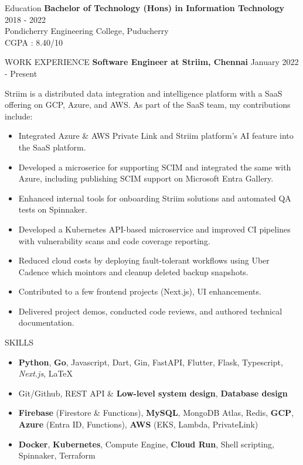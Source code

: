 \documentclass{template}
\begin{document}
\begin{rSection}{Education}
{\bf Bachelor of Technology (Hons) in Information Technology} \hfill {2018 - 2022} \\ 
Pondicherry Engineering College, Puducherry \\
CGPA : 8.40/10
\end{rSection}

\begin{rSection}{WORK EXPERIENCE}
\textbf{Software Engineer at Striim, Chennai} \hfill January 2022 - Present

Striim is a distributed data integration and intelligence platform with a SaaS offering on GCP, Azure, and AWS. As part of the SaaS team, my contributions include:
\begin{itemize}
\setlength{\parskip}{0pt}
\item Integrated Azure \& AWS Private Link and Striim platform's AI feature into the SaaS platform.
\item Developed a microserice for supporting SCIM and integrated the same with Azure, including publishing SCIM support on Microsoft Entra Gallery.
\item Enhanced internal tools for onboarding Striim solutions and automated QA tests on Spinnaker.
\item Developed a Kubernetes API-based microservice and improved CI pipelines with vulnerability scans and code coverage reporting.
\item Reduced cloud costs by deploying fault-tolerant workflows using Uber Cadence which mointors and cleanup deleted backup snapshots.
\item Contributed to a few frontend projects (Next.js), UI enhancements.
\item Delivered project demos, conducted code reviews, and authored technical documentation.
\end{itemize}
\end{rSection} 

\begin{rSection}{SKILLS}
\begin{itemize}
\setlength{\parskip}{0pt}
\item \textbf{Python}, \textbf{Go}, Javascript, Dart, Gin, FastAPI, Flutter, Flask, Typescript, \textit{Next.js}, \LaTeX    
\item Git/Github, REST API \& \textbf{Low-level system design}, \textbf{Database design}
\item \textbf{Firebase} (Firestore \& Functions), \textbf{MySQL}, MongoDB Atlas, Redis, \textbf{GCP}, \textbf{Azure} (Entra ID, Functions), \textbf{AWS} (EKS, Lambda, PrivateLink)\item \textbf{Docker}, \textbf{Kubernetes}, Compute Engine, \textbf{Cloud Run}, Shell scripting, Spinnaker, Terraform
\end{itemize}
\end{rSection}
\end{document}
